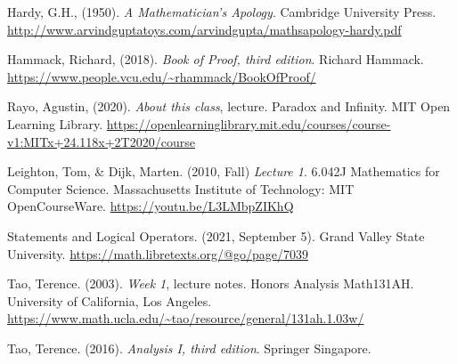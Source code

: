\documentclass{article}[12pt]
\begin{document}
    \begin{thebibliography}{9}
        
        Hardy, G.H., (1950). \emph{A Mathematician's Apology}. Cambridge University Press.
        \url{http://www.arvindguptatoys.com/arvindgupta/mathsapology-hardy.pdf}
        
        Hammack, Richard, (2018). \emph{Book of Proof, third edition}. Richard Hammack. \url{https://www.people.vcu.edu/~rhammack/BookOfProof/}
        
        
        Rayo, Agustin, (2020). \emph{About this class}, lecture. Paradox and Infinity. MIT Open Learning Library. \url{https://openlearninglibrary.mit.edu/courses/course-v1:MITx+24.118x+2T2020/course}
        
        Leighton, Tom, \& Dijk, Marten. (2010, Fall) \emph{Lecture 1}. 6.042J Mathematics for Computer Science. Massachusetts Institute of Technology: MIT OpenCourseWare. \url{https://youtu.be/L3LMbpZIKhQ}
        
        Statements and Logical Operators. (2021, September 5). Grand Valley State University. \url{https://math.libretexts.org/@go/page/7039}
        
        Tao, Terence. (2003). \emph{Week 1}, lecture notes. Honors Analysis Math131AH. University of California, Los Angeles. \url{https://www.math.ucla.edu/~tao/resource/general/131ah.1.03w/}
        
        Tao, Terence. (2016). \emph{Analysis I, third edition}. Springer Singapore.
        
    \end{thebibliography}
    
\end{document}
